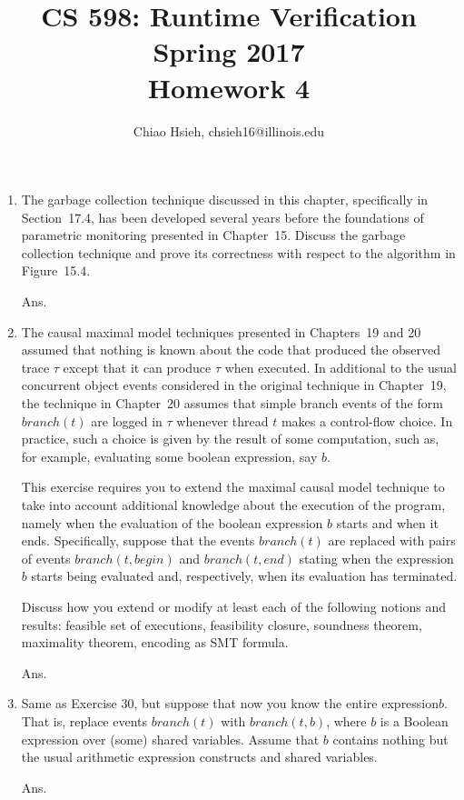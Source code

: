 \documentclass{article}
\title{\Large\bfseries CS 598: Runtime Verification \\
Spring 2017 \\
Homework 4}
\author{Chiao Hsieh, chsieh16@illinois.edu}
\begin{document}
\maketitle

\begin{enumerate}

\item The garbage collection technique discussed in this chapter, specifically in Section~17.4,
has been developed several years before the foundations of parametric monitoring presented in Chapter~15.
Discuss the garbage collection technique and prove its correctness with respect to the algorithm in Figure~15.4.

Ans.

\item The causal maximal model techniques presented in Chapters~19 and 20 assumed
that nothing is known about the code that produced the observed trace $\tau$
except that it can produce $\tau$ when executed.
In additional to the usual concurrent object events considered in the original
technique in Chapter~19,
the technique in Chapter~20 assumes that simple branch events of the form 
$branch(t)$ are logged in $\tau$ whenever thread $t$ makes a control-flow choice.
 In practice, such a choice is given by the result of some computation,
such as, for example, evaluating some boolean expression, say $b$.

This exercise requires you to extend the maximal causal model technique to take
into account additional knowledge about the execution of the program,
namely when the evaluation of the boolean expression $b$ starts and when it ends.
Specifically, suppose that the events $branch(t)$ are replaced with pairs of
events $branch(t, begin)$ and $branch(t,end)$ stating when the expression $b$
starts being evaluated and, respectively, when its evaluation has terminated.

Discuss how you extend or modify at least each of the following notions and
results: feasible set of executions, feasibility closure, soundness theorem,
maximality theorem, encoding as SMT formula.


Ans.

\item Same as Exercise 30, but suppose that now you know the entire expression$b$.
That is, replace events $branch(t)$ with $branch(t,b)$,
where $b$ is a Boolean expression over (some) shared variables.
Assume that $b$ contains nothing but the usual arithmetic expression constructs
and shared variables.

Ans.

\end{enumerate}
\end{document}
